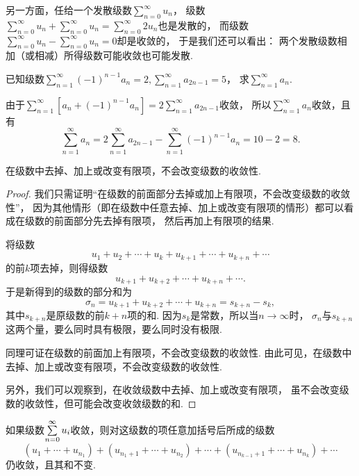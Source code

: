 {\def\s{\sum\limits_{n=0}^\infty }%
另一方面，任给一个发散级数\(\s u_n\)，%
级数\(\s u_n + \s u_n
= \s 2 u_n\)也是发散的，%
而级数\(\s u_n - \s u_n
= 0\)却是收敛的，%
于是我们还可以看出：
\color{red}两个发散级数相加（或相减）所得级数可能收敛也可能发散.}

\begin{example}
已知级数\(\sum\limits_{n=1}^\infty (-1)^{n-1} a_n = 2,
\sum\limits_{n=1}^\infty a_{2n-1} = 5\)，%
求\(\sum\limits_{n=1}^\infty a_n\).
\begin{solution}
由于\(\sum\limits_{n=1}^\infty [a_n + (-1)^{n-1} a_n]
= 2 \sum\limits_{n=1}^\infty a_{2n-1}\)收敛，%
所以\(\sum\limits_{n=1}^\infty a_n\)收敛，且有
\[
\sum\limits_{n=1}^\infty a_n
= 2 \sum\limits_{n=1}^\infty a_{2n-1}
- \sum\limits_{n=1}^\infty (-1)^{n-1} a_n
= 10 - 2 = 8.
\]
\end{solution}
\end{example}

\begin{property}\label{theorem:无穷级数.收敛级数性质3}
在级数中去掉、加上或改变有限项，不会改变级数的收敛性.
\begin{proof}
我们只需证明“在级数的前面部分去掉或加上有限项，不会改变级数的收敛性”，%
因为其他情形（即在级数中任意去掉、加上或改变有限项的情形）都可以看成在级数的前面部分先去掉有限项，%
然后再加上有限项的结果.

将级数\[
u_1+u_2+\dotsb+u_k+u_{k+1}+\dotsb+u_{k+n}+\dotsb
\]的前\(k\)项去掉，则得级数\[
u_{k+1}+u_{k+2}+\dotsb+u_{k+n}+\dotsb.
\]于是新得到的级数的部分和为\[
\sigma_n = u_{k+1}+u_{k+2}+\dotsb+u_{k+n} = s_{k+n} - s_k,
\]其中\(s_{k+n}\)是原级数的前\(k+n\)项的和.
因为\(s_k\)是常数，所以当\(n\to\infty\)时，%
\(\sigma_n\)与\(s_{k+n}\)这两个量，要么同时具有极限，要么同时没有极限.

同理可证在级数的前面加上有限项，不会改变级数的收敛性.
由此可见，在级数中去掉、加上或改变有限项，不会改变级数的收敛性.

另外，我们可以观察到，在收敛级数中去掉、加上或改变有限项，%
虽不会改变级数的收敛性，但可能会改变收敛级数的和.
\end{proof}
\end{property}

\begin{property}\label{theorem:无穷级数.收敛级数性质4}
如果级数\(\s u_i\)收敛，则对这级数的项任意加括号后所成的级数\[
(u_1+\dotsb+u_{n_1}) + (u_{n_1+1}+\dotsb+u_{n_2}) + \dotsb + (u_{n_{k-1}+1}+\dotsb+u_{n_k}) + \dotsb
\]仍收敛，且其和不变.
\end{property}

